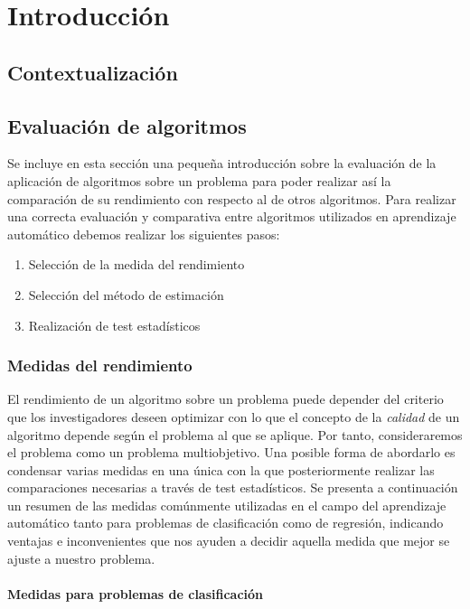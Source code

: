 \chapter{Introducción}
\setcounter{page}{1}

\section{Contextualización}

\section{Evaluación de algoritmos}

	Se incluye en esta sección una pequeña introducción sobre la evaluación de la aplicación de algoritmos sobre un problema para poder realizar así la comparación de su rendimiento con respecto al de otros algoritmos. Para realizar una correcta evaluación y comparativa entre algoritmos utilizados en aprendizaje automático debemos realizar los siguientes pasos:
	
	\begin{enumerate}
		\item Selección de la medida del rendimiento
		\item Selección del método de estimación
		\item Realización de test estadísticos
	\end{enumerate}

\subsection{Medidas del rendimiento}
	
	El rendimiento de un algoritmo sobre un problema puede depender del criterio que los investigadores deseen optimizar con lo que el concepto de la \textit{calidad} de un algoritmo depende según el problema al que se aplique. Por tanto, consideraremos el problema como un problema multiobjetivo. Una posible forma de abordarlo es condensar varias medidas en una única con la que posteriormente realizar las comparaciones necesarias a través de test estadísticos. Se presenta a continuación un resumen de las medidas comúnmente utilizadas en el campo del aprendizaje automático tanto para problemas de clasificación como de regresión, indicando ventajas e inconvenientes que nos ayuden a decidir aquella medida que mejor se ajuste a nuestro problema.
	
\subsubsection*{Medidas para problemas de clasificación}

